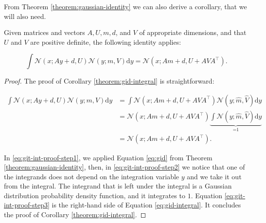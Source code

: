 From Theorem \ref{theorem:gaussian-identity} we can also derive a corollary, that we will also need.

\begin{corollary}\label{theorem:gid-integral}
    Given matrices and vectors $A, U, m, d$, and $V$ of appropriate dimensions, and that $U$ and $V$ are positive definite, the following identity applies:

    \begin{equation}\label{eq:gid-integral}
        \int \mathscr{N}(x ; A y + d, U) \mathscr{N}(y ; m, V) \mathrm{d}y=\mathscr{N}(x ; A m + d, U + A V A^\intercal).
    \end{equation}
\end{corollary}

\begin{proof}
    The proof of Corollary \ref{theorem:gid-integral} is straightforward:

    \begin{align}
        \int \mathscr{N}(x ; A y + d, U) \mathscr{N}(y ; m, V) \mathrm{d}y 
        &= \int \mathscr{N}(x ; A m + d, U + A V A^\intercal) \mathscr{N}(y ; \hat{m}, \hat{V}) \mathrm{d}y \label{eq:git-int-proof-step1} \\
        &= \mathscr{N}(x ; A m + d, U + A V A^\intercal) \underbrace{\int \mathscr{N}(y ; \hat{m}, \hat{V}) \mathrm{d}y}_{\text{=1}} \label{eq:git-int-proof-step2}\\
        &= \mathscr{N}(x ; A m + d, U + A V A^\intercal). \label{eq:git-int-proof-step3}
    \end{align}

    In \ref{eq:git-int-proof-step1}, we applied Equation \ref{eq:gid} from Theorem \ref{theorem:gaussian-identity}, then, in \ref{eq:git-int-proof-step2} we notice that one of the integrands does not depend on the integration variable $y$ and we take it out from the integral. The integrand that is left under the integral is a Gaussian distribution probability density function, and it integrates to $1$. Equation \ref{eq:git-int-proof-step3} is the right-hand side of Equation \ref{eq:gid-integral}. It concludes the proof of Corollary \ref{theorem:gid-integral}.
\end{proof}
